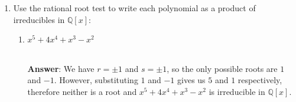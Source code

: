 \documentclass{article}
\begin{document}
\begin{enumerate}
            \begin{enumerate}
                  \item Show that $\mathbb{Q}[\sqrt{2}]$ is a subring of $\mathbb{R}$.\\
                        \textbf{Answer}: We have $(r_0+r_1(\sqrt{2})+\cdots+r_n(\sqrt{2})^n)-(s_0+s_1(\sqrt{2})+\cdots+s_n(\sqrt{2})^n)=(r_0-s_0)+(r_1-s_1)(\sqrt{2})+\cdots+(r_n-s_n)(\sqrt{2})^n\in\mathbb{Q}[\sqrt{2}]$ and $(r_0+r_1(\sqrt{2})+\cdots+r_n(\sqrt{2})^n)(s_0+s_1(\sqrt{2})+\cdots+s_n(\sqrt{2})^n)=(r_0s_0)+(r_1s_1)(\sqrt{2})^2+\cdots+(r_ns_n)(\sqrt{2})^{2n}\in\mathbb{Q}[\sqrt{2}]$. Therefore $\mathbb{Q}[\sqrt{2}]$ is closed under both subtraction and multiplication, so it is a subring of $\mathbb{R}$ by Theorem 3.6.
                  \item Show that the function $\theta:\mathbb{Q}[x]\rightarrow\mathbb{Q}[\sqrt{2}]$ defined by $\theta(f(x))=f(\sqrt{2})$ is a surjective homomorphism, but not an isomorphism.\\
                        \textbf{Answer}:
                        \begin{enumerate}
                              \item Take $f(x)=2$ and $g(x)=x^2$, we have $\theta(f(x))=2=\theta(g(x))$ for $f(x)\neq g(x)$. Therefore $\theta$ is not injective.
                              \item We can take $f(x)=r_0+r_1x+\cdots+r_nx^n\in\mathbb{Q}[x]$ such that $\theta(f(x))=r_0+r_1(\sqrt{2})+\cdots+r_n(\sqrt{2})^n$ for every element in $\mathbb{Q}[\sqrt{2}]$. Therefore $\theta$ is surjective.
                              \item Let $f(x),g(x)\in\mathbb{R}[x]$, $p(x)=f(x)+g(x)$ and $q(x)=f(x)g(x)$, we have \[\theta(f(x)+g(x))=\theta(p(x))=p(\sqrt{2})=f(\sqrt{2})+g(\sqrt{2})=\theta(f(x))+\theta(g(x))\] and \[\theta(f(x)g(x))=\theta(q(x))=q(\sqrt{2})=f(\sqrt{2})g(\sqrt{2})=\theta(f(x))\theta(g(x)).\]
                        \end{enumerate}
            \end{enumerate}
      \item Use the rational root test to write each polynomial as a product of irreducibles in $\mathbb{Q}[x]$:
            \begin{enumerate}[start=2]
                  \item $x^5+4x^4+x^3-x^2$\addtocounter{enumii}{1}\\
                        \textbf{Answer}: We have $r=\pm 1$ and $s=\pm 1$, so the only possible roots are $1$ and $-1$. However, substituting $1$ and $-1$ gives us $5$ and $1$ respectively, therefore neither is a root and $x^5+4x^4+x^3-x^2$ is irreducible in $\mathbb{Q}[x]$.

\end{enumerate}
\end{enumerate}
\end{document}
